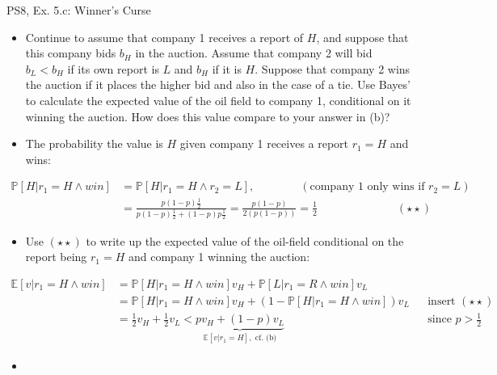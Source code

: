 \begin{frame}{PS8, Ex. 5.c: Winner's Curse}
      \begin{itemize}
        \item[(c)] Continue to assume that company 1 receives a report of $H$, and suppose that this company bids $b_H$ in the auction. Assume that company 2 will bid $b_L < b_H$ if its own report is $L$ and $b_H$ if it is $H$. Suppose that company 2 wins the auction if it places the higher bid and also in the case of a tie. Use Bayes’ to calculate the expected value of the oil field to company 1, conditional on it winning the auction. How does this value compare to your answer in (b)?
        \item[Step 1:] The probability the value is $H$ given company 1 receives a report $r_1=H$ and wins:
        \end{itemize}
        \vspace{-10pt}
        \begin{align*}
          \mathbb{P}[H|r_1=H\wedge win]&=\mathbb{P}[H|r_1=H\wedge r_2=L],\quad\quad\quad\quad(\text{company 1 only wins if }r_2=L)\\
            &=\frac{p(1-p)\frac{1}{2}}{p(1-p)\frac{1}{2}+(1-p)p\frac{1}{2}}=\frac{p(1-p)}{2(p(1-p))}=\frac{1}{2}\quad\quad\quad\quad\quad\quad\quad(\star\star)
        \end{align*}
        \vspace{-12pt}
        \begin{itemize}
        \item[Step 2:] Use $(\star\star)$ to write up the expected value of the oil-field conditional on the report being $r_1=H$ and company 1 winning the auction:
      \end{itemize}
      \vspace{-8pt}
      \begin{align*}
        \mathbb{E}[v|r_1=H\wedge win]&=\mathbb{P}[H|r_1=H\wedge win]v_H+\mathbb{P}[L|r_1=R\wedge win]v_L\\
        &=\mathbb{P}[H|r_1=H\wedge win]v_H+\left(1-\mathbb{P}[H|r_1=H\wedge win]\right)v_L&&\text{insert }(\star\star)\\
        &=\frac{1}{2}v_H+\frac{1}{2}v_L<\underbrace{pv_H+(1-p)v_L}_{\textstyle\mathbb{E}[v|r_1=H],\text{ cf. (b)}}&&\text{since }p>\frac{1}{2}
      \end{align*}
      \vspace{-10pt}
      \begin{itemize}
        \item[Step 3:] 
      \end{itemize}
      \vfill\null
\end{frame}
